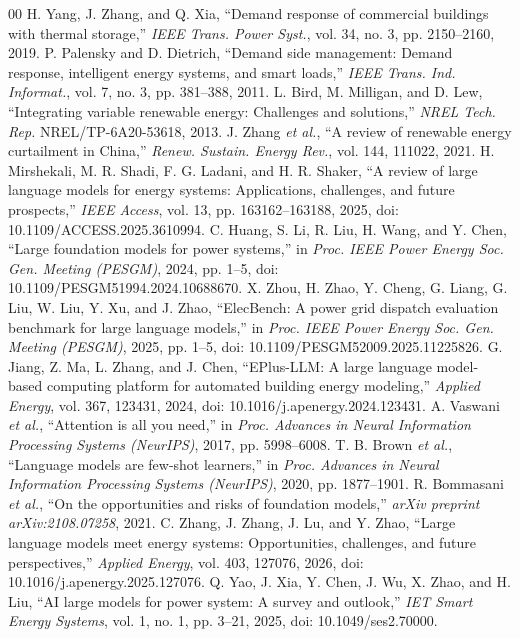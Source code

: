 \documentclass{ieeeaccess}
\begin{document}
\begin{thebibliography}{00}
 H. Yang, J. Zhang, and Q. Xia, ``Demand response of commercial buildings with thermal storage,'' \emph{IEEE Trans. Power Syst.}, vol. 34, no. 3, pp. 2150--2160, 2019.
 P. Palensky and D. Dietrich, ``Demand side management: Demand response, intelligent energy systems, and smart loads,'' \emph{IEEE Trans. Ind. Informat.}, vol. 7, no. 3, pp. 381--388, 2011.
 L. Bird, M. Milligan, and D. Lew, ``Integrating variable renewable energy: Challenges and solutions,'' \emph{NREL Tech. Rep.} NREL/TP-6A20-53618, 2013.
 J. Zhang \emph{et al.}, ``A review of renewable energy curtailment in China,'' \emph{Renew. Sustain. Energy Rev.}, vol. 144, 111022, 2021.
 H. Mirshekali, M. R. Shadi, F. G. Ladani, and H. R. Shaker, ``A review of large language models for energy systems: Applications, challenges, and future prospects,'' \emph{IEEE Access}, vol. 13, pp. 163162--163188, 2025, doi: 10.1109/ACCESS.2025.3610994.
 C. Huang, S. Li, R. Liu, H. Wang, and Y. Chen, ``Large foundation models for power systems,'' in \emph{Proc. IEEE Power Energy Soc. Gen. Meeting (PESGM)}, 2024, pp. 1--5, doi: 10.1109/PESGM51994.2024.10688670.
 X. Zhou, H. Zhao, Y. Cheng, G. Liang, G. Liu, W. Liu, Y. Xu, and J. Zhao, ``ElecBench: A power grid dispatch evaluation benchmark for large language models,'' in \emph{Proc. IEEE Power Energy Soc. Gen. Meeting (PESGM)}, 2025, pp. 1--5, doi: 10.1109/PESGM52009.2025.11225826.
 G. Jiang, Z. Ma, L. Zhang, and J. Chen, ``EPlus-LLM: A large language model-based computing platform for automated building energy modeling,'' \emph{Applied Energy}, vol. 367, 123431, 2024, doi: 10.1016/j.apenergy.2024.123431.
 A. Vaswani \emph{et al.}, ``Attention is all you need,'' in \emph{Proc. Advances in Neural Information Processing Systems (NeurIPS)}, 2017, pp. 5998--6008.
 T. B. Brown \emph{et al.}, ``Language models are few-shot learners,'' in \emph{Proc. Advances in Neural Information Processing Systems (NeurIPS)}, 2020, pp. 1877--1901.
 R. Bommasani \emph{et al.}, ``On the opportunities and risks of foundation models,'' \emph{arXiv preprint arXiv:2108.07258}, 2021.
 C. Zhang, J. Zhang, J. Lu, and Y. Zhao, ``Large language models meet energy systems: Opportunities, challenges, and future perspectives,'' \emph{Applied Energy}, vol. 403, 127076, 2026, doi: 10.1016/j.apenergy.2025.127076.
 Q. Yao, J. Xia, Y. Chen, J. Wu, X. Zhao, and H. Liu, ``AI large models for power system: A survey and outlook,'' \emph{IET Smart Energy Systems}, vol. 1, no. 1, pp. 3--21, 2025, doi: 10.1049/ses2.70000.

\end{thebibliography}
\end{document}
